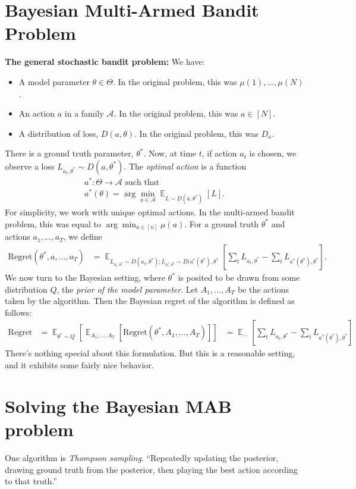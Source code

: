 \documentclass[11pt]{article}
\newcommand{\E}{\mathop{\mathbb{E}}}
\newcommand{\ra}{\rightarrow}
\begin{document}
\section{Bayesian Multi-Armed Bandit Problem}
\textbf{The general stochastic bandit problem:}
We have:
\begin{itemize}
  \item A model parameter $\theta \in \Theta$. In the original problem, this was $\mu(1),\dots,\mu(N)$.
  \item An action $a$ in a family $\mathcal{A}$. In the original problem, this was $a \in [N]$.
  \item A distribution of loss, $D(a, \theta)$. In the original problem, this was $D_a$.
\end{itemize}
There is a ground truth parameter, $\theta^*$.
Now, at time $t$, if action $a_t$ is chosen, 
we observe a loss $L_{a_t, \theta^*} \sim D(a, \theta^*)$.
The \textit{optimal action} is a function
\begin{align*}
  a^* : \Theta \ra \mathcal{A} \textrm{ such that} \\
  a^*(\theta) = \arg \min_{a \in \mathcal{A}} \E_{L \sim D(a, \theta^*)}[L].
\end{align*}
For simplicity, we work with unique optimal actions.
In the multi-armed bandit problem, this was equal to $\arg \min_{a \in [n]} \mu(a)$.
For a ground truth $\theta^*$ and actions $a_1, \dots, a_T$,
we define
\newcommand{\Regret}{\mathrm{Regret}}
\begin{align*}
  \Regret(\theta^*, a, \dots, a_T) 
  &= \E_{L_{a_t, \theta^*} \sim D(a_t, \theta^*); L_{a^*_t, \theta^*}\sim D(a^*(\theta^*), \theta^*}\left[ \sum_t L_{a_t, \theta^*} - \sum_t L_{a^*(\theta^*), \theta^*} \right].
\end{align*}
We now turn to the Bayesian setting, 
where $\theta^*$ is posited to be drawn from some distribution $Q$, 
the \textit{prior of the model parameter}.
Let $A_1, \dots, A_T$ be the actions taken by the algorithm.
Then the Bayesian regret of the algorithm is defined as follows:
\begin{align*}
  \Regret &=\E_{\theta^* \sim Q} \left[ \E_{A_1, \dots, A_T} \left[ \Regret(\theta^*, A_1,\dots,A_T) \right] \right]
  &= \E_{\cdots} \left[ \sum_t L_{a_t, \theta^*} - \sum_t L_{a^*(\theta^*), \theta^*} \right]
\end{align*}
There's nothing special about this formulation. But this is a reasonable setting, and 
it exhibits some fairly nice behavior.

\section{Solving the Bayesian MAB problem}
One algorithm is \textit{Thompson sampling}.
``Repeatedly updating the posterior, 
drawing ground truth from the posterior, 
then playing the best action according to that truth.''
\end{document}
